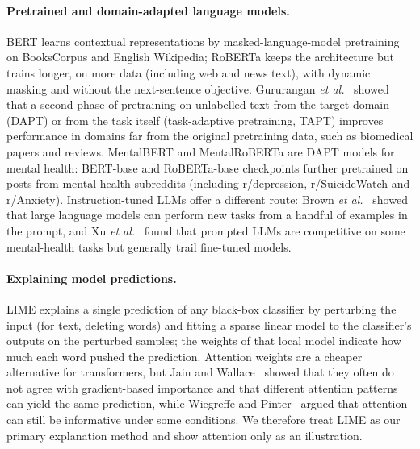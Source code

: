 \paragraph{Pretrained and domain-adapted language models.}
BERT \cite{devlin2019bert} learns contextual representations by masked-language-model pretraining
on BooksCorpus and English Wikipedia; RoBERTa \cite{liu2019roberta} keeps the architecture but trains
longer, on more data (including web and news text), with dynamic masking and without the
next-sentence objective. Gururangan {\it et al.}~ showed that a second phase of pretraining on
unlabelled text from the target domain (DAPT) or from the task itself (task-adaptive pretraining,
TAPT) improves performance in domains far from the original pretraining data, such as biomedical
papers and reviews. MentalBERT and MentalRoBERTa \cite{ji2022mentalbert} are DAPT models for mental
health: BERT-base and RoBERTa-base checkpoints further pretrained on posts from mental-health
subreddits (including r/depression, r/SuicideWatch and r/Anxiety).
Instruction-tuned LLMs offer a different route: Brown {\it et al.}~ showed that large language
models can perform new tasks from a handful of examples in the prompt, and Xu {\it et al.}~
found that prompted LLMs are competitive on some mental-health tasks but generally trail fine-tuned
models.

\paragraph{Explaining model predictions.}
LIME \cite{ribeiro2016lime} explains a single prediction of any black-box classifier by perturbing
the input (for text, deleting words) and fitting a sparse linear model to the classifier's outputs on
the perturbed samples; the weights of that local model indicate how much each word pushed the
prediction. Attention weights are a cheaper alternative for transformers, but
Jain and Wallace~ showed that they often do not agree with gradient-based importance and that
different attention patterns can yield the same prediction, while Wiegreffe and Pinter~
argued that attention can still be informative under some conditions. We therefore treat LIME as our
primary explanation method and show attention only as an illustration.

